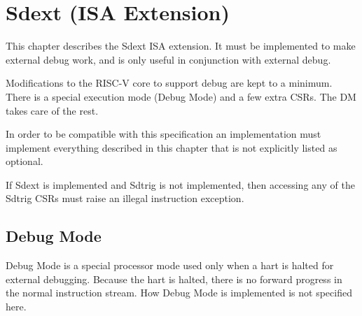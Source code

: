 \chapter{Sdext (ISA Extension)}
\label{sec:core_debug}

This chapter describes the Sdext ISA extension. It must be implemented to make
external debug work, and is only useful in conjunction with external debug.

Modifications to the RISC-V core to support debug are kept to a minimum.  There
is a special execution mode (Debug Mode) and a few extra CSRs. The DM takes care
of the rest.

In order to be compatible with this specification an implementation must
implement everything described in this chapter that is not explicitly listed as
optional.

If Sdext is implemented and Sdtrig is not implemented, then accessing any of the
Sdtrig CSRs must raise an illegal instruction exception.

\section{Debug Mode} \label{debugmode}

Debug Mode is a special processor mode used only when a hart is halted for
external debugging. Because the hart is halted, there is no forward progress in
the normal instruction stream.
How Debug Mode is implemented is not specified here.

